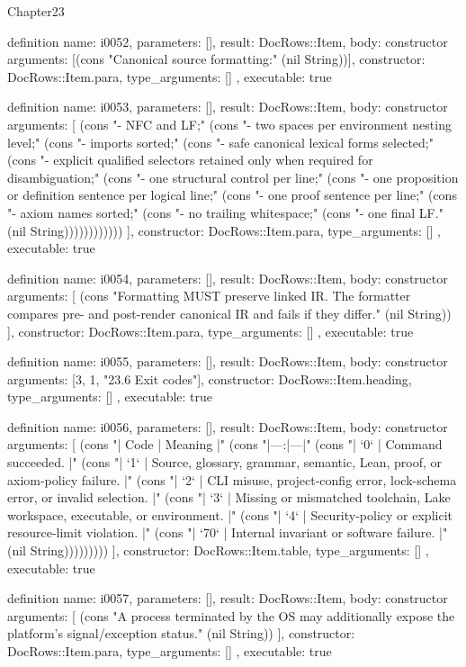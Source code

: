 \begin{lexlean}{Chapter23}
\begin{semanticmodule}
definition{
  name: i0052,
  parameters: [],
  result: DocRows::Item,
  body: constructor{
    arguments: [(cons "Canonical source formatting:" (nil String))],
    constructor: DocRows::Item.para,
    type_arguments: []
  },
  executable: true
}

definition{
  name: i0053,
  parameters: [],
  result: DocRows::Item,
  body: constructor{
    arguments: [
      (cons "- NFC and LF;" (cons "- two spaces per environment nesting level;" (cons "- imports sorted;" (cons "- safe canonical lexical forms selected;" (cons "- explicit qualified selectors retained only when required for disambiguation;" (cons "- one structural control per line;" (cons "- one proposition or definition sentence per logical line;" (cons "- one proof sentence per line;" (cons "- axiom names sorted;" (cons "- no trailing whitespace;" (cons "- one final LF." (nil String))))))))))))
    ],
    constructor: DocRows::Item.para,
    type_arguments: []
  },
  executable: true
}

definition{
  name: i0054,
  parameters: [],
  result: DocRows::Item,
  body: constructor{
    arguments: [
      (cons "Formatting MUST preserve linked IR. The formatter compares pre- and post-render canonical IR and fails if they differ." (nil String))
    ],
    constructor: DocRows::Item.para,
    type_arguments: []
  },
  executable: true
}

definition{
  name: i0055,
  parameters: [],
  result: DocRows::Item,
  body: constructor{
    arguments: [3, 1, "23.6 Exit codes"],
    constructor: DocRows::Item.heading,
    type_arguments: []
  },
  executable: true
}

definition{
  name: i0056,
  parameters: [],
  result: DocRows::Item,
  body: constructor{
    arguments: [
      (cons "| Code | Meaning |" (cons "|---:|---|" (cons "| `0` | Command succeeded. |" (cons "| `1` | Source, glossary, grammar, semantic, Lean, proof, or axiom-policy failure. |" (cons "| `2` | CLI misuse, project-config error, lock-schema error, or invalid selection. |" (cons "| `3` | Missing or mismatched toolchain, Lake workspace, executable, or environment. |" (cons "| `4` | Security-policy or explicit resource-limit violation. |" (cons "| `70` | Internal invariant or software failure. |" (nil String)))))))))
    ],
    constructor: DocRows::Item.table,
    type_arguments: []
  },
  executable: true
}

definition{
  name: i0057,
  parameters: [],
  result: DocRows::Item,
  body: constructor{
    arguments: [
      (cons "A process terminated by the OS may additionally expose the platform's signal/exception status." (nil String))
    ],
    constructor: DocRows::Item.para,
    type_arguments: []
  },
  executable: true
}


\end{semanticmodule}
\end{lexlean}
